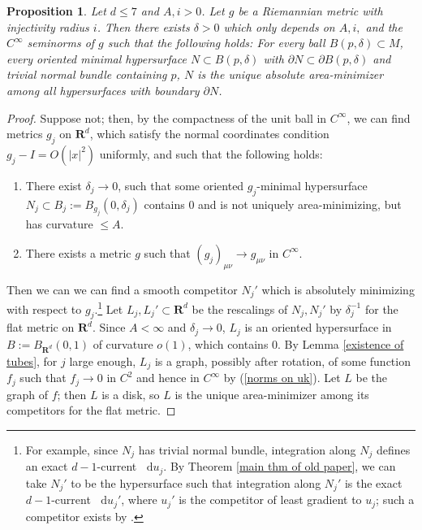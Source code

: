 \documentclass[reqno,11pt]{amsart}
\newcommand{\RR}{\mathbf{R}}
\newcommand*\dif{\mathop{}\!\mathrm{d}}
\newtheorem{proposition}[theorem]{Proposition}
\theoremstyle{definition}
\numberwithin{equation}{section}
\begin{document}
\begin{proposition}\label{minimal implies locally minimizing}
Let $d \leq 7$ and $A, i > 0$.
Let $g$ be a Riemannian metric with injectivity radius $i$.
Then there exists $\delta > 0$ which only depends on $A, i,$ and the $C^\infty$ seminorms of $g$ such that the following holds:
For every ball $B(p, \delta) \subset M$, every oriented minimal hypersurface $N \subset B(p, \delta)$ with $\partial N \subset \partial B(p, \delta)$ and trivial normal bundle containing $p$, $N$ is the unique absolute area-minimizer among all hypersurfaces with boundary $\partial N$.
\end{proposition}
\begin{proof}
Suppose not; then, by the compactness of the unit ball in $C^\infty$, we can find metrics $g_j$ on $\RR^d$, which satisfy the normal coordinates condition $g_j - I = O(|x|^2)$ uniformly, and such that the following holds:
\begin{enumerate}
\item There exist $\delta_j \to 0$, such that some oriented $g_j$-minimal hypersurface $N_j \subset B_j := B_{g_j}(0, \delta_j)$ contains $0$ and is not uniquely area-minimizing, but has curvature $\leq A$.
\item There exists a metric $g$ such that $(g_j)_{\mu\nu} \to g_{\mu\nu}$ in $C^\infty$.
\end{enumerate}
Then we can we can find a smooth competitor $N_j'$ which is absolutely minimizing with respect to $g_j$.\footnote{For example, since $N_j$ has trivial normal bundle, integration along $N_j$ defines an exact $d - 1$-current $\dif u_j$. By Theorem \ref{main thm of old paper}, we can take $N_j'$ to be the hypersurface such that integration along $N_j'$ is the exact $d - 1$-current $\dif u_j'$, where $u_j'$ is the competitor of least gradient to $u_j$; such a competitor exists by \cite[Theorem 1.1]{Mazon14}.}
Let $L_j, L_j' \subset \RR^d$ be the rescalings of $N_j, N_j'$ by $\delta_j^{-1}$ for the flat metric on $\RR^d$.
Since $A < \infty$ and $\delta_j \to 0$, $L_j$ is an oriented hypersurface in $B := B_{\RR^d}(0, 1)$ of curvature $o(1)$, which contains $0$.
By Lemma \ref{existence of tubes}, for $j$ large enough, $L_j$ is a graph, possibly after rotation, of some function $f_j$ such that $f_j \to 0$ in $C^2$ and hence in $C^\infty$ by (\ref{norms on uk}).
Let $L$ be the graph of $f$; then $L$ is a disk, so $L$ is the unique area-minimizer among its competitors for the flat metric.


\end{proof}
\end{document}

